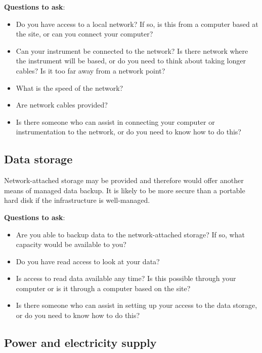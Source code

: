 \documentclass[12pt,a4paper,oneside]{report}
\providecommand{\tightlist}{%
  \setlength{\itemsep}{0pt}\setlength{\parskip}{0pt}}
\begin{document}
\textbf{Questions to ask}:

\begin{itemize}
\tightlist
\item
  Do you have access to a local network? If so, is this from a computer
  based at the site, or can you connect your computer?
\item
  Can your instrument be connected to the network? Is there network
  where the instrument will be based, or do you need to think about
  taking longer cables? Is it too far away from a network point?
\item
  What is the speed of the network?
\item
  Are network cables provided?
\item
  Is there someone who can assist in connecting your computer or
  instrumentation to the network, or do you need to know how to do this?
\end{itemize}

\hypertarget{data-storage}{%
\subsection{Data storage}\label{data-storage}}

Network-attached storage may be provided and therefore would offer
another means of managed data backup. It is likely to be more secure
than a portable hard disk if the infrastructure is well-managed.

\textbf{Questions to ask}:

\begin{itemize}
\tightlist
\item
  Are you able to backup data to the network-attached storage? If so,
  what capacity would be available to you?
\item
  Do you have read access to look at your data?
\item
  Is access to read data available any time? Is this possible through
  your computer or is it through a computer based on the site?
\item
  Is there someone who can assist in setting up your access to the data
  storage, or do you need to know how to do this?
\end{itemize}

\hypertarget{power-and-electricity-supply}{%
\subsection{Power and electricity
supply}\label{power-and-electricity-supply}}
\end{document}
